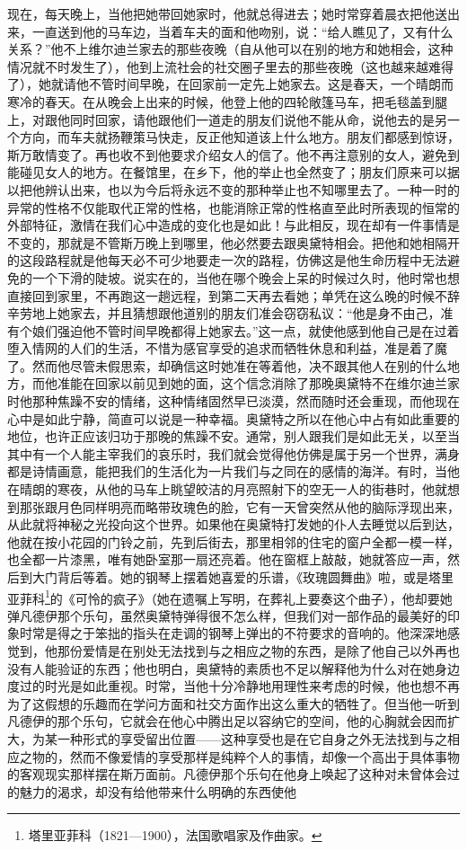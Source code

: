 \par 现在，每天晚上，当他把她带回她家时，他就总得进去；她时常穿着晨衣把他送出来，一直送到他的马车边，当着车夫的面和他吻别，说：“给人瞧见了，又有什么关系？”他不上维尔迪兰家去的那些夜晚（自从他可以在别的地方和她相会，这种情况就不时发生了），他到上流社会的社交圈子里去的那些夜晚（这也越来越难得了），她就请他不管时间早晚，在回家前一定先上她家去。这是春天，一个晴朗而寒冷的春天。在从晚会上出来的时候，他登上他的四轮敞篷马车，把毛毯盖到腿上，对跟他同时回家，请他跟他们一道走的朋友们说他不能从命，说他去的是另一个方向，而车夫就扬鞭策马快走，反正他知道该上什么地方。朋友们都感到惊讶，斯万敢情变了。再也收不到他要求介绍女人的信了。他不再注意别的女人，避免到能碰见女人的地方。在餐馆里，在乡下，他的举止也全然变了；朋友们原来可以据以把他辨认出来，也以为今后将永远不变的那种举止也不知哪里去了。一种一时的异常的性格不仅能取代正常的性格，也能消除正常的性格直至此时所表现的恒常的外部特征，激情在我们心中造成的变化也是如此！与此相反，现在却有一件事情是不变的，那就是不管斯万晚上到哪里，他必然要去跟奥黛特相会。把他和她相隔开的这段路程就是他每天必不可少地要走一次的路程，仿佛这是他生命历程中无法避免的一个下滑的陡坡。说实在的，当他在哪个晚会上呆的时候过久时，他时常也想直接回到家里，不再跑这一趟远程，到第二天再去看她；单凭在这么晚的时候不辞辛劳地上她家去，并且猜想跟他道别的朋友们准会窃窃私议：“他是身不由己，准有个娘们强迫他不管时间早晚都得上她家去。”这一点，就使他感到他自己是在过着堕入情网的人们的生活，不惜为感官享受的追求而牺牲休息和利益，准是着了魔了。然而他尽管未假思索，却确信这时她准在等着他，决不跟其他人在别的什么地方，而他准能在回家以前见到她的面，这个信念消除了那晚奥黛特不在维尔迪兰家时他那种焦躁不安的情绪，这种情绪固然早已淡漠，然而随时还会重现，而他现在心中是如此宁静，简直可以说是一种幸福。奥黛特之所以在他心中占有如此重要的地位，也许正应该归功于那晚的焦躁不安。通常，别人跟我们是如此无关，以至当其中有一个人能主宰我们的哀乐时，我们就会觉得他仿佛是属于另一个世界，满身都是诗情画意，能把我们的生活化为一片我们与之同在的感情的海洋。有时，当他在晴朗的寒夜，从他的马车上眺望皎洁的月亮照射下的空无一人的街巷时，他就想到那张跟月色同样明亮而略带玫瑰色的脸，它有一天曾突然从他的脑际浮现出来，从此就将神秘之光投向这个世界。如果他在奥黛特打发她的仆人去睡觉以后到达，他就在按小花园的门铃之前，先到后街去，那里相邻的住宅的窗户全都一模一样，也全都一片漆黑，唯有她卧室那一扇还亮着。他在窗框上敲敲，她就答应一声，然后到大门背后等着。她的钢琴上摆着她喜爱的乐谱，《玫瑰圆舞曲》啦，或是塔里亚菲科\footnote{塔里亚菲科（1821—1900），法国歌唱家及作曲家。}的《可怜的疯子》（她在遗嘱上写明，在葬礼上要奏这个曲子），他却要她弹凡德伊那个乐句，虽然奥黛特弹得很不怎么样，但我们对一部作品的最美好的印象时常是得之于笨拙的指头在走调的钢琴上弹出的不符要求的音响的。他深深地感觉到，他那份爱情是在别处无法找到与之相应之物的东西，是除了他自己以外再也没有人能验证的东西；他也明白，奥黛特的素质也不足以解释他为什么对在她身边度过的时光是如此重视。时常，当他十分冷静地用理性来考虑的时候，他也想不再为了这假想的乐趣而在学问方面和社交方面作出这么重大的牺牲了。但当他一听到凡德伊的那个乐句，它就会在他心中腾出足以容纳它的空间，他的心胸就会因而扩大，为某一种形式的享受留出位置——这种享受也是在它自身之外无法找到与之相应之物的，然而不像爱情的享受那样是纯粹个人的事情，却像一个高出于具体事物的客观现实那样摆在斯万面前。凡德伊那个乐句在他身上唤起了这种对未曾体会过的魅力的渴求，却没有给他带来什么明确的东西使他